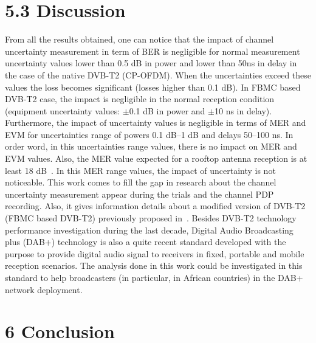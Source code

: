 \documentclass[10pt]{article}
\begin{document}
\section*{5.3 Discussion}

From all the results obtained, one can notice that the impact of channel uncertainty measurement in term of BER is negligible for normal measurement uncertainty values lower than 0.5 dB in power and lower than 50ns in delay in the case of the native DVB-T2 (CP-OFDM). When the uncertainties exceed these values the loss becomes significant (losses higher than 0.1 dB). In FBMC based DVB-T2 case, the impact is negligible in the normal reception condition (equipment uncertainty values: $\pm$0.1 dB in power and $\pm$10 ns in delay). Furthermore, the impact of uncertainty values is negligible in terms of MER and EVM for uncertainties range of powers 0.1 dB–1 dB and delays 50–100 ns. In order word, in this uncertainties range values, there is no impact on MER and EVM values. Also, the MER value expected for a rooftop antenna reception is at least 18 dB~\cite{Fisher}. In this MER range values, the impact of uncertainty is not noticeable. This work comes to fill the gap in research about the channel uncertainty measurement appear during the trials and the channel PDP recording. Also, it gives information details about a modified version of DVB-T2 (FBMC based DVB-T2) previously proposed in~\cite{Honfoga2019, Honfoga2020_1}. Besides DVB-T2 technology performance investigation during the last decade, Digital Audio Broadcasting plus (DAB+) technology is also a quite recent standard developed with the purpose to provide digital audio signal to receivers in fixed, portable and mobile reception scenarios. The analysis done in this work could be investigated in this standard to help broadcasters (in particular, in African countries) in the DAB+ network deployment.

\section*{6 Conclusion}
\end{document}
